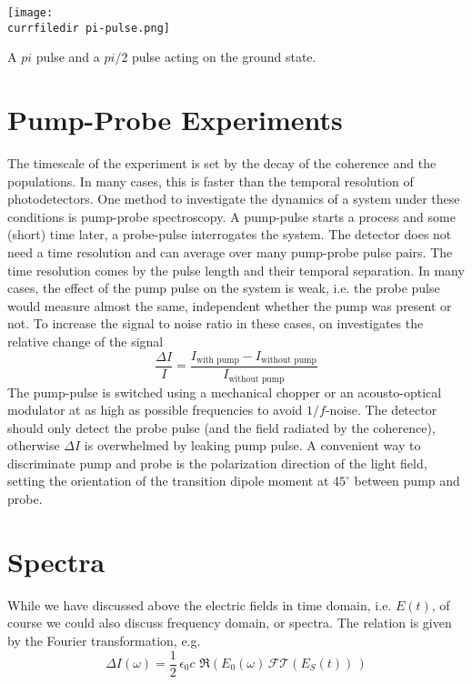 \begin{marginfigure}
\texttt{[image: \\currfiledir pi-pulse.png]}
\caption{A $pi$ pulse and a $pi/2$ pulse acting on the ground state.}
\end{marginfigure}

\section{Pump-Probe Experiments}

The timescale of the experiment is set by the decay of the coherence and the populations. In many cases, this is faster than the temporal resolution of photodetectors. One method to investigate the dynamics of a system under these conditions is pump-probe spectroscopy. A pump-pulse starts a process and some (short) time later, a probe-pulse interrogates the system. The detector does not need a time resolution and can average over many pump-probe pulse pairs. The time resolution comes by the pulse length and their temporal separation. In many cases, the effect of the pump pulse on the system is weak, i.e. the probe pulse would measure almost the same, independent whether the pump was present or not. To increase the signal to noise ratio in these cases, on investigates the relative change of the signal
\begin{equation}
 \frac{\Delta I}{I} = \frac{I_\text{with pump} - I_\text{without pump} }{I_\text{without pump}}
\end{equation}
The pump-pulse is switched using a mechanical chopper or an acousto-optical modulator at as high as possible frequencies to avoid $1/f$-noise. The detector should only detect the probe pulse (and the field radiated by the coherence), otherwise $\Delta I$ is overwhelmed by leaking pump pulse. A convenient way to discriminate pump and probe is the polarization direction of the light field, setting the orientation of the transition dipole moment at $45^\circ$ between pump and probe.



\section{Spectra}

While we have discussed above the electric fields in time domain, i.e. $E(t)$, of course we could also discuss frequency domain, or spectra. The relation is given by the Fourier transformation, e.g.
\begin{equation}
\Delta I (\omega) = \frac{1}{2} \, \epsilon_0 c \, \, \Re \left( E_0(\omega) \, \mathcal{FT} ( E_S(t) ) \, \right)
\end{equation}


\printbibliography[segment=\therefsegment,heading=subbibliography]
